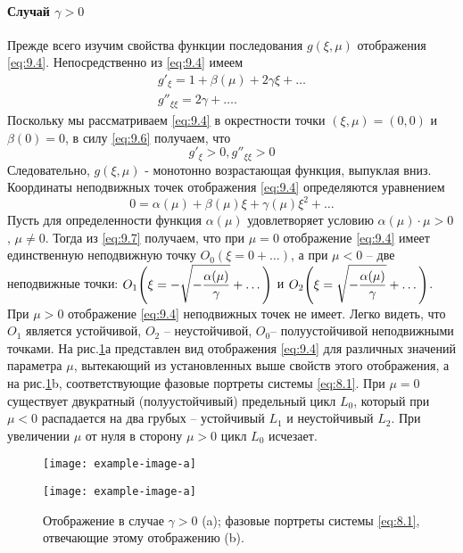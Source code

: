 \paragraph{Случай $\gamma>0$}%

Прежде всего изучим свойства функции последования $g(\xi,\mu)$ отображения \eqref{eq:9.4}. Непосредственно из \eqref{eq:9.4} имеем
\begin{equation}
        \label{eq:9.6}
        \begin{gathered}
                g'_\xi = 1 + \beta(\mu) + 2\gamma\xi+\dots \\
                g''_{\xi\xi}=2\gamma + \dots.
        \end{gathered}
\end{equation}
Поскольку мы рассматриваем \eqref{eq:9.4} в окрестности точки $(\xi,\mu)=(0,0)$ и $\beta(0) = 0$,
в силу \eqref{eq:9.6} получаем, что
\begin{equation}
        \label{eq:}
        g'_\xi>0, g''_{\xi\xi}>0
\end{equation}
Следовательно, $g(\xi,\mu)$ - монотонно возрастающая функция, выпуклая вниз.
Координаты неподвижных точек отображения \eqref{eq:9.4} определяются уравнением
\begin{equation}
        \label{eq:9.7}
        0 = \alpha(\mu) + \beta(\mu)\xi + \gamma(\mu) \xi^2 + \dots
\end{equation}
Пусть для определенности функция $\alpha(\mu)$ удовлетворяет условию $\alpha(\mu)\cdot \mu>0$,
$\mu\neq 0$. Тогда из \eqref{eq:9.7} получаем, что при $\mu=0$ отображение \eqref{eq:9.4}
имеет единственную неподвижную точку $O_0(\xi=0+\dots)$, а при $\mu<0$ -- две неподвижные точки:
$\displaystyle O_1\qty(\xi= - \sqrt{ - \frac{\alpha(\mu)}{\gamma}} + \dots)$
и 
$\displaystyle O_2\qty(\xi=  \sqrt{ - \frac{\alpha(\mu)}{\gamma}} + \dots)$.
При $\mu>0$ отображение \eqref{eq:9.4} неподвижных точек не имеет. Легко видеть, что $O_1$ является устойчивой, $O_2$ -- неустойчивой, $O_0$-- полуустойчивой неподвижными точками. На рис.\ref{fig:9.2}а представлен вид отображения \eqref{eq:9.4} для различных значений параметра $\mu$, 
вытекающий из установленных выше свойств этого отображения, а на рис.\ref{fig:9.2}b, соответствующие
фазовые портреты системы \eqref{eq:8.1}. При $\mu=0$ существует двукратный (полуустойчивый)
предельный цикл $L_0$, который при $\mu<0$ распадается на два грубых -- устойчивый 
$L_1$ и неустойчивый $L_2$. При увеличении $\mu$ от нуля в сторону $\mu>0$ цикл $L_0$ исчезает.
\begin{figure}[h]
        \centering
        \begin{minipage}{\linewidth}
            \centering
            \texttt{[image: example-image-a]}                
        \end{minipage}
        \hfill
        \begin{minipage}{\linewidth}
            \centering
            \texttt{[image: example-image-a]} 
        \end{minipage}
        \caption{Отображение в случае $\gamma>0$ (a); фазовые портреты системы \eqref{eq:8.1},
        отвечающие этому отображению (b).}
        \label{fig:9.2}
\end{figure}
